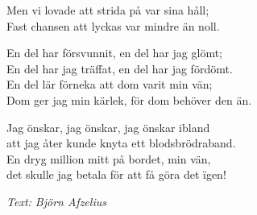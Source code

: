 Men vi lovade att strida på var sina håll;\\
Fast chansen att lyckas var mindre än noll.\par
\vspace{10pt}
En del har försvunnit, en del har jag glömt;\\
En del har jag träffat, en del har jag fördömt.\\
En del lär förneka att dom varit min vän;\\
Dom ger jag min kärlek, för dom behöver den än.\par
\vspace{10pt}
Jag önskar, jag önskar, jag önskar ibland\\
att jag åter kunde knyta ett blodsbrödraband.\\
En dryg million mitt på bordet, min vän,\\
det skulle jag betala för att få göra det ïgen!
\par
\vspace{10pt}
{\footnotesize\textit{Text: Björn Afzelius}}
